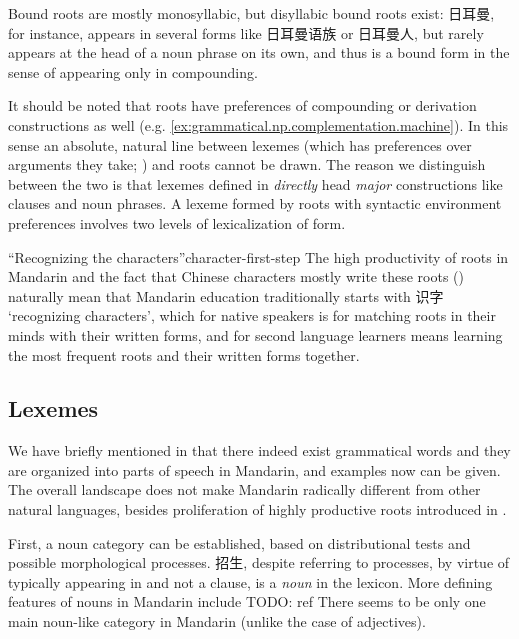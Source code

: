 \documentclass[UTF8, a4paper, oneside, scheme=plain, 12pt]{ctexrep}
\newcommand*{\term}[1]{\emph{#1}}
\newcommand{\translate}[1]{`#1'}
\begin{document}
Bound roots are mostly monosyllabic,
but disyllabic bound roots exist:
日耳曼, for instance, appears in several forms like 日耳曼语族 or 日耳曼人,
but rarely appears at the head of a noun phrase on its own,
and thus is a bound form in the sense of appearing only in compounding.

It should be noted that roots have preferences of compounding or derivation constructions as well 
(e.g. \ref{ex:grammatical.np.complementation.machine}).
In this sense an absolute, natural line between lexemes
(which has preferences over arguments they take; ) and roots cannot be drawn.
The reason we distinguish between the two is that 
lexemes defined in 
\emph{directly} head \emph{major} constructions like clauses and noun phrases.
A lexeme formed by roots with syntactic environment preferences
involves two levels of lexicalization of form.

\begin{teachbox}{``Recognizing the characters''}{character-first-step}
    The high productivity of roots in Mandarin 
    and the fact that Chinese characters mostly write these roots ()
    naturally mean that Mandarin education traditionally starts with 识字 \translate{recognizing characters},
    which for native speakers is for matching roots in their minds with their written forms,
    and for second language learners means learning the most frequent roots and their written forms together.
\end{teachbox}

\subsection{Lexemes}\label{sec:grammatical.lexicon.words}

We have briefly mentioned in 
that there indeed exist grammatical words and they are organized into parts of speech in Mandarin,
and examples now can be given.
The overall landscape does not make Mandarin radically different from other natural languages,
besides proliferation of highly productive roots introduced in .

First, a noun category can be established,
based on distributional tests and possible morphological processes.
招生, despite referring to processes,
by virtue of typically appearing in 
and not a clause, is a \term{noun} in the lexicon.
More defining features of nouns in Mandarin include TODO: ref
There seems to be only one main noun-like category in Mandarin
(unlike the case of adjectives).
\end{document}
